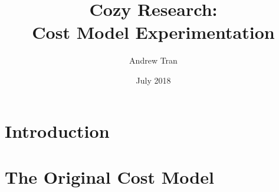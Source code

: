 \documentclass[12pt]{article}
\title{Cozy Research: \\ Cost Model Experimentation}
\author{Andrew Tran}
\date{July 2018}
\begin{document}
\maketitle

\section{Introduction}


\section{The Original Cost Model}

\end{document}
